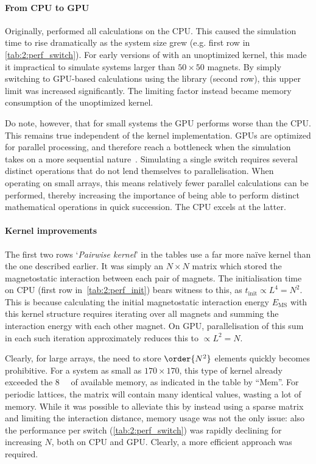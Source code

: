 \paragraph{From CPU to GPU}
Originally, \hotspice performed all calculations on the CPU. %
This caused the simulation time to rise dramatically as the system size grew (e.g. first row in \cref{tab:2:perf_switch}).
For early versions of \hotspice with an unoptimized kernel, this made it impractical to simulate systems larger than $50 \times 50$ magnets.
By simply switching to GPU-based calculations using the  library (second row), this upper limit was increased significantly.
The limiting factor instead became memory consumption of the unoptimized kernel. \par
Do note, however, that for small systems the GPU performs worse than the CPU.
This remains true independent of the kernel implementation.
GPUs are optimized for parallel processing, and therefore reach a bottleneck when the simulation takes on a more sequential nature~\cite{owens2008gpu}.
Simulating a single switch requires several distinct operations that do not lend themselves to parallelisation.
When operating on small arrays, this means relatively fewer parallel calculations can be performed, thereby increasing the importance of being able to perform distinct mathematical operations in quick succession.
The CPU excels at the latter. %

\paragraph{Kernel improvements}
The first two rows `\textit{Pairwise kernel}' in the tables use a far more na\"ive kernel than the one described earlier.
It was simply an $N \times N$ matrix which stored the magnetostatic interaction between each pair of magnets.
The initialisation time on CPU (first row in~\cref{tab:2:perf_init}) bears witness to this, as $t_\mathrm{init} \propto L^4 = N^2$.
This is because calculating the initial magnetostatic interaction energy $E_\mathrm{MS}$ with this kernel structure requires iterating over all magnets and summing the interaction energy with each other magnet.
On GPU, parallelisation of this sum in each such iteration approximately reduces this to $\propto L^2 = N$. \par
Clearly, for large arrays, the need to store $\order{N^2}$ elements quickly becomes prohibitive.
For a system as small as $170 \times 170$, this type of kernel already exceeded the \SI{8}{\giga\byte} of available memory, as indicated in the table by ``Mem''.
For periodic lattices, the matrix will contain many identical values, wasting a lot of memory.
While it was possible to alleviate this by instead using a sparse matrix and limiting the interaction distance, memory usage was not the only issue: also the performance per switch (\cref{tab:2:perf_switch}) was rapidly declining for increasing $N$, both on CPU and GPU. %
Clearly, a more efficient approach was required. \\\par

